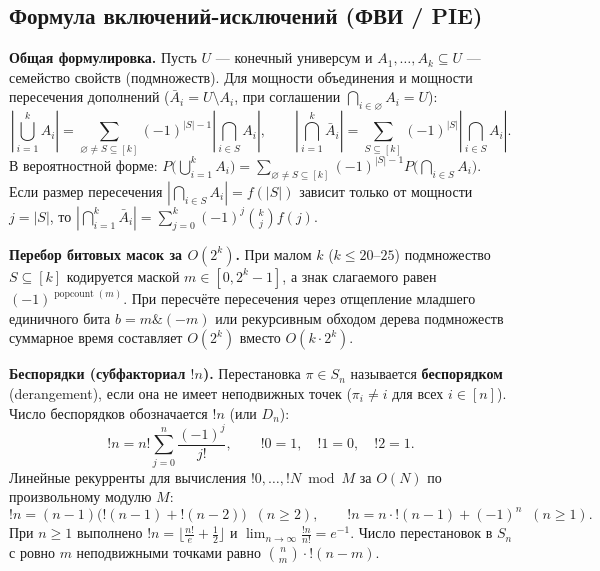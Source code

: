 \documentclass[10pt,a4paper]{article}
\renewcommand{\le}{\leqslant}
\renewcommand{\ge}{\geqslant}
\renewcommand{\emptyset}{\varnothing}
\DeclareMathOperator{\popcnt}{popcount}
\begin{document}
\subsection{Формула включений-исключений (ФВИ / PIE)}

\textbf{Общая формулировка.} Пусть $U$ — конечный универсум и $A_1, \dots, A_k \subseteq U$ — семейство свойств (подмножеств). Для мощности объединения и мощности пересечения дополнений ($\bar{A}_i = U \setminus A_i$, при соглашении $\bigcap_{i \in \emptyset} A_i = U$):
\[
  \left|\bigcup_{i=1}^{k} A_i\right| = \sum_{\emptyset \ne S \subseteq [k]} (-1)^{|S| - 1} \left|\bigcap_{i \in S} A_i\right|, \qquad
  \left|\bigcap_{i=1}^{k} \bar{A}_i\right| = \sum_{S \subseteq [k]} (-1)^{|S|} \left|\bigcap_{i \in S} A_i\right|.
\]
В вероятностной форме: $P\bigl(\bigcup_{i=1}^k A_i\bigr) = \sum_{\emptyset \ne S \subseteq [k]} (-1)^{|S|-1} P\bigl(\bigcap_{i \in S} A_i\bigr)$. Если размер пересечения $\left|\bigcap_{i \in S} A_i\right| = f(|S|)$ зависит только от мощности $j = |S|$, то $\left|\bigcap_{i=1}^k \bar{A}_i\right| = \sum_{j=0}^k (-1)^j \binom{k}{j} f(j)$.

\textbf{Перебор битовых масок за $O(2^k)$.} При малом $k$ ($k \le 20\text{--}25$) подмножество $S \subseteq [k]$ кодируется маской $m \in [0, 2^k - 1]$, а знак слагаемого равен $(-1)^{\popcnt(m)}$. При пересчёте пересечения через отщепление младшего единичного бита $b = m \mathbin{\&} (-m)$ или рекурсивным обходом дерева подмножеств суммарное время составляет $O(2^k)$ вместо $O(k \cdot 2^k)$.

\textbf{Беспорядки (субфакториал $!n$).} Перестановка $\pi \in S_n$ называется \textbf{беспорядком} (derangement), если она не имеет неподвижных точек ($\pi_i \ne i$ для всех $i \in [n]$). Число беспорядков обозначается $!n$ (или $D_n$):
\[
  !n = n! \sum_{j=0}^{n} \frac{(-1)^j}{j!}, \qquad !0 = 1, \quad !1 = 0, \quad !2 = 1.
\]
Линейные рекурренты для вычисления $!0, \dots, !N \bmod M$ за $O(N)$ по произвольному модулю $M$:
\[
  !n = (n - 1)\bigl(!(n - 1) + !(n - 2)\bigr) \;\; (n \ge 2), \qquad
  !n = n \cdot !(n - 1) + (-1)^n \;\; (n \ge 1).
\]
При $n \ge 1$ выполнено $!n = \bigl\lfloor \frac{n!}{e} + \frac{1}{2} \bigr\rfloor$ и $\lim_{n \to \infty} \frac{!n}{n!} = e^{-1}$. Число перестановок в $S_n$ с ровно $m$ неподвижными точками равно $\binom{n}{m} \cdot !(n - m)$.
\end{document}
